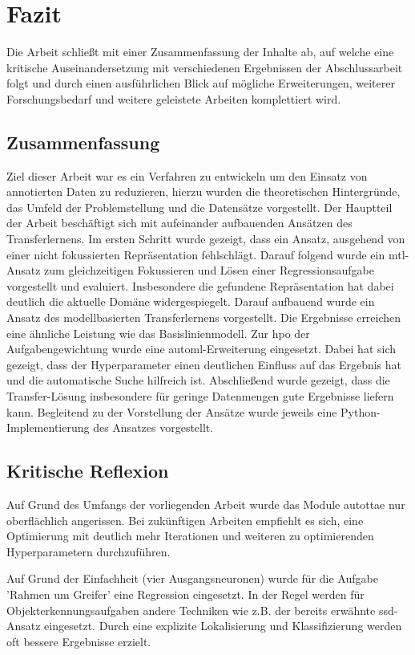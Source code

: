 \chapter{Fazit}
\label{chap:Fazit}
Die Arbeit schließt mit einer Zusammenfassung der Inhalte ab, auf welche eine kritische Auseinandersetzung mit verschiedenen Ergebnissen der Abschlussarbeit folgt und durch einen ausführlichen Blick auf mögliche Erweiterungen, weiterer Forschungsbedarf und weitere geleistete Arbeiten komplettiert wird.
 
	\section{Zusammenfassung}
	\label{sec:Zusammenfassung}
	Ziel dieser Arbeit war es ein Verfahren zu entwickeln um den Einsatz von annotierten Daten zu reduzieren, hierzu wurden die theoretischen Hintergründe, das Umfeld der Problemstellung und die Datensätze vorgestellt. Der Hauptteil der Arbeit beschäftigt sich mit aufeinander aufbauenden Ansätzen des Transferlernens. Im ersten Schritt wurde gezeigt, dass ein Ansatz, ausgehend von einer nicht fokussierten Repräsentation fehlschlägt. Darauf folgend wurde ein \acl{mtl}-Ansatz zum gleichzeitigen Fokussieren und Lösen einer Regressionsaufgabe vorgestellt und evaluiert. Insbesondere die gefundene Repräsentation hat dabei deutlich die aktuelle Domäne widergespiegelt. Darauf aufbauend wurde ein Ansatz des modellbasierten Transferlernens vorgestellt. Die Ergebnisse erreichen eine ähnliche Leistung wie das Basislinienmodell. Zur \ac{hpo} der Aufgabengewichtung wurde eine \ac{automl}-Erweiterung eingesetzt. Dabei hat sich gezeigt, dass der Hyperparameter einen deutlichen Einfluss auf das Ergebnis hat und die automatische Suche hilfreich ist. Abschließend wurde gezeigt, dass die Transfer-Lösung insbesondere für geringe Datenmengen gute Ergebnisse liefern kann. Begleitend zu der Vorstellung der Ansätze wurde jeweils eine Python-Implementierung des Ansatzes vorgestellt. 
	
	\section{Kritische Reflexion}
	\label{sec:KritischeReflexion}
	Auf Grund des Umfangs der vorliegenden Arbeit wurde das Module \ac{autottae} nur oberflächlich angerissen. Bei zukünftigen Arbeiten empfiehlt es sich, eine Optimierung mit deutlich mehr Iterationen und weiteren zu optimierenden Hyperparametern durchzuführen.
	
	Auf Grund der Einfachheit (vier Ausgangsneuronen) wurde für die Aufgabe 'Rahmen um Greifer' eine Regression eingesetzt. In der Regel werden für Objekterkennungsaufgaben andere Techniken wie z.B. der bereits erwähnte \ac{ssd}-Ansatz eingesetzt. Durch eine explizite Lokalisierung und Klassifizierung werden oft bessere Ergebnisse erzielt.
	
